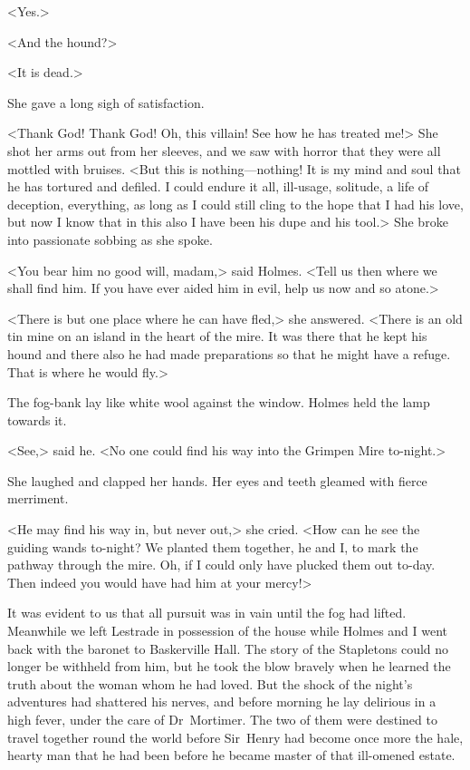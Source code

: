<Yes.>

<And the hound?>

<It is dead.>

She gave a long sigh of satisfaction.

<Thank God! Thank God! Oh, this villain! See how he has treated me!> She shot her arms out from her sleeves, and we saw with horror that they were all mottled with bruises. <But this is nothing—nothing! It is my mind and soul that he has tortured and defiled. I could endure it all, ill-usage, solitude, a life of deception, everything, as long as I could still cling to the hope that I had his love, but now I know that in this also I have been his dupe and his tool.> She broke into passionate sobbing as she spoke.

<You bear him no good will, madam,> said Holmes. <Tell us then where we shall find him. If you have ever aided him in evil, help us now and so atone.>

<There is but one place where he can have fled,> she answered. <There is an old tin mine on an island in the heart of the mire. It was there that he kept his hound and there also he had made preparations so that he might have a refuge. That is where he would fly.>

The fog-bank lay like white wool against the window. Holmes held the lamp towards it.

<See,> said he. <No one could find his way into the Grimpen Mire to-night.>

She laughed and clapped her hands. Her eyes and teeth gleamed with fierce merriment.

<He may find his way in, but never out,> she cried. <How can he see the guiding wands to-night? We planted them together, he and I, to mark the pathway through the mire. Oh, if I could only have plucked them out to-day. Then indeed you would have had him at your mercy!>

It was evident to us that all pursuit was in vain until the fog had lifted. Meanwhile we left Lestrade in possession of the house while Holmes and I went back with the baronet to Baskerville Hall. The story of the Stapletons could no longer be withheld from him, but he took the blow bravely when he learned the truth about the woman whom he had loved. But the shock of the night's adventures had shattered his nerves, and before morning he lay delirious in a high fever, under the care of Dr~Mortimer. The two of them were destined to travel together round the world before Sir~Henry had become once more the hale, hearty man that he had been before he became master of that ill-omened estate.

